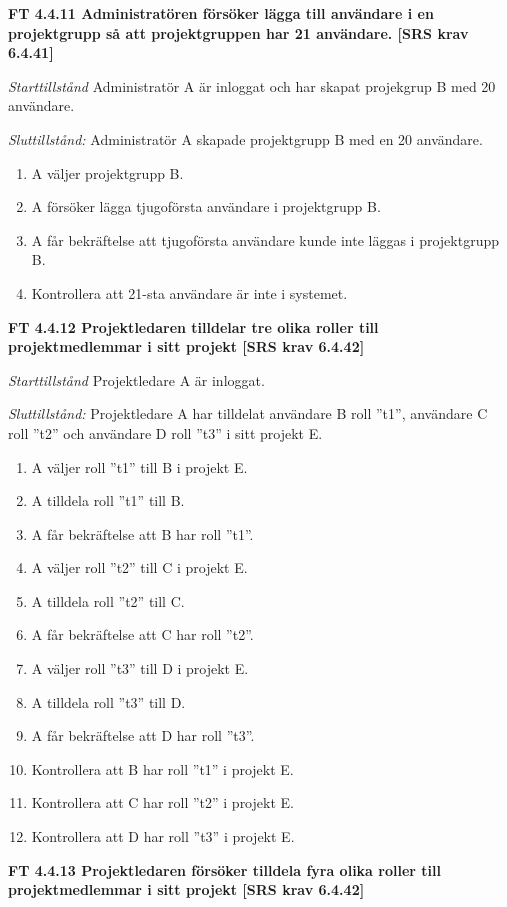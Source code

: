 \documentclass[a4paper]{article}
\begin{document}
\textbf{FT 4.4.11 Administratören försöker lägga till användare i en projektgrupp så att projektgruppen har 21 användare. [SRS krav 6.4.41]}

\emph{Starttillstånd} Administratör A är inloggat och har skapat projekgrup B med 20 användare.

\emph{Sluttillstånd:} Administratör A  skapade  projektgrupp B med en 20  användare.

\begin{enumerate}
\item A väljer projektgrupp B.
\item A försöker lägga tjugoförsta användare i projektgrupp B.
\item A får bekräftelse att tjugoförsta användare kunde inte läggas i projektgrupp B.
\item Kontrollera att 21-sta användare är inte i systemet.
\end{enumerate}

\textbf{FT 4.4.12 Projektledaren tilldelar tre olika roller till projektmedlemmar i sitt projekt [SRS krav 6.4.42]}

\emph{Starttillstånd} Projektledare A är inloggat.

\emph{Sluttillstånd:} Projektledare A  har tilldelat användare B roll ”t1”, användare C roll ”t2” och användare D roll ”t3” i sitt projekt E.

\begin{enumerate}
\item A väljer roll ”t1” till B i projekt E.
\item A tilldela roll ”t1” till B.
\item A får bekräftelse att B har roll ”t1”.
\item A väljer roll ”t2” till C i projekt E.
\item A tilldela roll ”t2” till C.
\item A får bekräftelse att C har roll ”t2”.
\item A väljer roll ”t3” till D i projekt E.
\item A tilldela roll ”t3” till D.
\item A får bekräftelse att D har roll ”t3”.
\item Kontrollera att B har roll ”t1” i projekt E.
\item Kontrollera att C har roll ”t2” i projekt E.
\item Kontrollera att D har roll ”t3” i projekt E.
\end{enumerate}

\textbf{FT 4.4.13 Projektledaren försöker tilldela fyra olika roller till projektmedlemmar i sitt projekt [SRS krav 6.4.42]}
\end{document}
